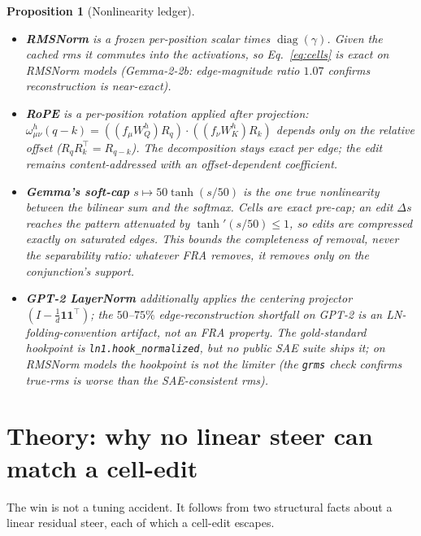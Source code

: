 \documentclass[11pt]{article}
\newcommand{\diag}{\operatorname{diag}}
\newcommand{\hook}[1]{\texttt{#1}}
\theoremstyle{definition}
\theoremstyle{plain}
\newtheorem{proposition}{Proposition}
\theoremstyle{remark}
\begin{document}
\begin{proposition}[Nonlinearity ledger]\label{prop:ledger}\leavevmode
\begin{itemize}[leftmargin=1.4em,itemsep=2pt]
  \item \textbf{RMSNorm} is a frozen per-position \emph{scalar} times $\diag(\gamma)$. Given the cached rms it commutes into the activations, so Eq.~\eqref{eq:cells} is exact on RMSNorm models (Gemma-2-2b: edge-magnitude ratio $1.07$ confirms reconstruction is near-exact).
  \item \textbf{RoPE} is a per-position \emph{rotation} applied after projection: $\omega^h_{\mu\nu}(q-k) = ((f_\mu W_Q^h)R_q)\cdot((f_\nu W_K^h)R_k)$ depends only on the relative offset ($R_q R_k^{\top} = R_{q-k}$). The decomposition stays exact per edge; the edit remains content-addressed with an offset-dependent coefficient.
  \item \textbf{Gemma's soft-cap} $s \mapsto 50\tanh(s/50)$ is the \emph{one} true nonlinearity between the bilinear sum and the softmax. Cells are exact pre-cap; an edit $\Delta s$ reaches the pattern attenuated by $\tanh'(s/50)\le 1$, so edits are compressed exactly on saturated edges. This bounds the \emph{completeness of removal}, never the separability ratio: whatever FRA removes, it removes only on the conjunction's support.
  \item \textbf{GPT-2 LayerNorm} additionally applies the centering projector $(I-\tfrac{1}{d}\mathbf{1}\mathbf{1}^{\top})$; the $50$--$75\%$ edge-reconstruction shortfall on GPT-2 is an LN-folding-convention artifact, not an FRA property. The gold-standard hookpoint is \hook{ln1.hook\_normalized}, but no public SAE suite ships it; on RMSNorm models the hookpoint is not the limiter (the \texttt{grms} check confirms true-rms is worse than the SAE-consistent rms).
\end{itemize}
\end{proposition}

\section{Theory: why no linear steer can match a cell-edit}\label{sec:theory}

The win is not a tuning accident. It follows from two structural facts about a linear residual steer, each of which a cell-edit escapes.
\end{document}
